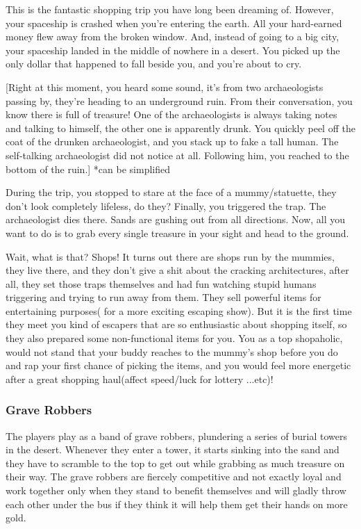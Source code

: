 This is the fantastic shopping trip you have long been dreaming of.
However, your spaceship is crashed when you’re entering the earth. All your hard-earned money flew away from the broken window. And, instead of going to a big city, your spaceship landed in the middle of nowhere in a desert.
You picked up the only dollar that happened to fall beside you, and you’re about to cry.

[Right at this moment, you heard some sound, it’s from two archaeologists passing by, they’re heading to an underground ruin. From their conversation, you know there is full of treasure!
One of the archaeologists is always taking notes and talking to himself, the other one is apparently drunk.
You quickly peel off the coat of the drunken archaeologist, and you stack up to fake a tall human. The self-talking archaeologist did not notice at all. Following him, you reached to the bottom of the ruin.] *can be simplified

During the trip, you stopped to stare at the face of a mummy/statuette, they don’t look completely lifeless, do they?
Finally, you triggered the trap. The archaeologist dies there. Sands are gushing out from all directions. Now, all you want to do is to grab every single treasure in your sight and head to the ground.

Wait, what is that? Shops! It turns out there are shops run by the mummies, they live there, and they don’t give a shit about the cracking architectures, after all, they set those traps themselves and had fun watching stupid humans triggering and trying to run away from them. They sell powerful items for entertaining purposes( for a more exciting escaping show). But it is the first time they meet you kind of escapers that are so enthusiastic about shopping itself, so they also prepared some non-functional items for you. You as a top shopaholic, would not stand that your buddy reaches to the mummy’s shop before you do and rap your first chance of picking the items, and you would feel more energetic after a great shopping haul(affect speed/luck for lottery ...etc)!

\subsubsection{Grave Robbers}

The players play as a band of grave robbers, plundering a series of burial towers in the desert. Whenever they enter a tower, it starts sinking into the sand and they have to scramble to the top to get out while grabbing as much treasure on their way. The grave robbers are fiercely competitive and not exactly loyal and work together only when they stand to benefit themselves and will gladly throw each other under the bus if they think it will help them get their hands on more gold.

